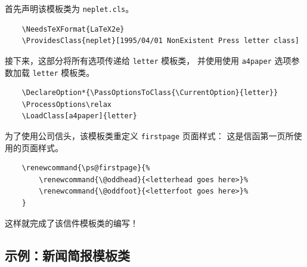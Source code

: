 \documentclass{ltxguide}[1995/11/28]
\begin{document}
首先声明该模板类为 \verb|neplet.cls|。
\begin{verbatim}
	\NeedsTeXFormat{LaTeX2e}
	\ProvidesClass{neplet}[1995/04/01 NonExistent Press letter class]
\end{verbatim}
接下来，这部分将所有选项传递给 \verb|letter| 模板类，
并使用使用 \verb|a4paper| 选项参数加载 \verb|letter| 模板类。
\begin{verbatim}
	\DeclareOption*{\PassOptionsToClass{\CurrentOption}{letter}}
	\ProcessOptions\relax
	\LoadClass[a4paper]{letter}
\end{verbatim}
为了使用公司信头，该模板类重定义 \verb|firstpage| 页面样式：
这是信函第一页所使用的页面样式。
\begin{verbatim}
	\renewcommand{\ps@firstpage}{%
		\renewcommand{\@oddhead}{<letterhead goes here>}%
		\renewcommand{\@oddfoot}{<letterfoot goes here>}%
	}
\end{verbatim}
这样就完成了该信件模板类的编写！

\subsection{示例：新闻简报模板类}
\end{document}
